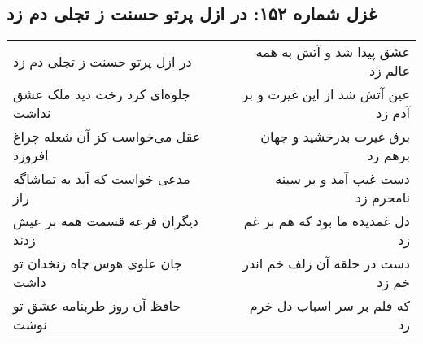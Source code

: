 \begin{center}
\section*{غزل شماره ۱۵۲: در ازل پرتو حسنت ز تجلی دم زد}
\label{sec:sh152}
\begin{longtable}{l p{0.5cm} r}
در ازل پرتو حسنت ز تجلی دم زد
&&
عشق پیدا شد و آتش به همه عالم زد
\\
جلوه‌ای کرد رخت دید ملک عشق نداشت
&&
عین آتش شد از این غیرت و بر آدم زد
\\
عقل می‌خواست کز آن شعله چراغ افروزد
&&
برق غیرت بدرخشید و جهان برهم زد
\\
مدعی خواست که آید به تماشاگه راز
&&
دست غیب آمد و بر سینه نامحرم زد
\\
دیگران قرعه قسمت همه بر عیش زدند
&&
دل غمدیده ما بود که هم بر غم زد
\\
جان علوی هوس چاه زنخدان تو داشت
&&
دست در حلقه آن زلف خم اندر خم زد
\\
حافظ آن روز طربنامه عشق تو نوشت
&&
که قلم بر سر اسباب دل خرم زد
\\
\end{longtable}
\end{center}
